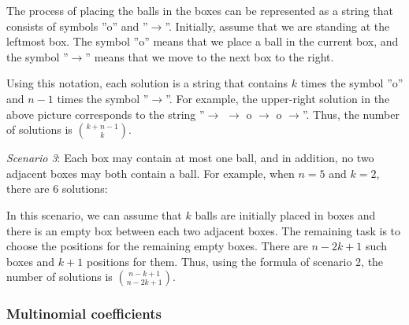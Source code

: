 The process of placing the balls in the boxes
can be represented as a string
that consists of symbols
''o'' and ''$\rightarrow$''.
Initially, assume that we are standing at the leftmost box.
The symbol ''o'' means that we place a ball
in the current box, and the symbol
''$\rightarrow$'' means that we move to
the next box to the right.

Using this notation, each solution is a string
that contains $k$ times the symbol ''o'' and
$n-1$ times the symbol ''$\rightarrow$''.
For example, the upper-right solution
in the above picture corresponds to the string
''$\rightarrow$ $\rightarrow$ o $\rightarrow$ o $\rightarrow$''.
Thus, the number of solutions is
$\binom{k+n-1}{k}$.

\textit{Scenario 3}: Each box may contain at most one ball,
and in addition, no two adjacent boxes may both contain a ball.
For example, when $n=5$ and $k=2$,
there are 6 solutions:


\begin{center}
\end{center}

In this scenario, we can assume that
$k$ balls are initially placed in boxes
and there is an empty box between each
two adjacent boxes.
The remaining task is to choose the
positions for the remaining empty boxes.
There are $n-2k+1$ such boxes and
$k+1$ positions for them.
Thus, using the formula of scenario 2,
the number of solutions is
$\binom{n-k+1}{n-2k+1}$.

\subsubsection{Multinomial coefficients}

